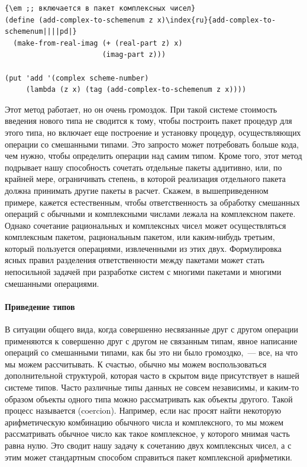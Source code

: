 \begin{Verbatim}[fontsize=\small]
{\em ;; включается в пакет комплексных чисел}
(define (add-complex-to-schemenum z x)\index{ru}{add-complex-to-schemenum||||pd|}
  (make-from-real-imag (+ (real-part z) x)
                       (imag-part z)))

(put 'add '(complex scheme-number)
     (lambda (z x) (tag (add-complex-to-schemenum z x))))
\end{Verbatim}

Этот метод работает, но он очень громоздок.  При такой
системе стоимость введения нового типа не сводится к тому,
чтобы построить пакет процедур для этого типа, но включает еще 
построение и установку процедур, осуществляющих операции со
смешанными типами.  Это запросто может потребовать больше кода, чем
нужно, чтобы определить операции над самим типом.  Кроме того, этот
метод подрывает нашу способность сочетать отдельные пакеты аддитивно,
или, по крайней мере, ограничивать степень, в которой реализация
отдельного пакета должна принимать другие пакеты в расчет.
Скажем, в вышеприведенном примере, кажется естественным, чтобы
ответственность за обработку смешанных операций с обычными и
комплексными числами лежала на комплексном пакете.  Однако сочетание
рациональных и комплексных чисел может осуществляться комплексным
пакетом, рациональным пакетом, или каким-нибудь третьим, который
пользуется операциями, извлеченными из этих двух.  Формулировка ясных
правил разделения ответственности между пакетами может стать
непосильной задачей при разработке систем с многими пакетами и многими
смешанными операциями.

\paragraph{Приведение типов}


В ситуации общего вида, когда совершенно несвязанные
друг с другом операции применяются к совершенно друг с другом не
связанным типам, явное написание операций со смешанными типами, как бы
это ни было громоздко,~--- все, на что мы можем рассчитывать.  К счастью,
обычно мы можем воспользоваться дополнительной структурой, которая часто в
скрытом виде присутствует в нашей системе типов.  Часто
различные типы данных не совсем независимы, и каким-то образом объекты
одного типа можно рассматривать как объекты другого.  Такой процесс
называется  (coercion).
Например, если нас просят найти некоторую арифметическую комбинацию обычного
числа и комплексного, то мы можем рассматривать обычное число как такое
комплексное, у которого мнимая часть равна нулю.  Это сводит нашу
задачу к сочетанию двух комплексных чисел, а с этим может стандартным
способом справиться пакет комплексной арифметики.

